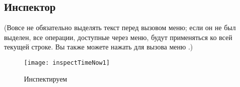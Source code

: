 \documentclass[a4paper,10pt,twoside]{book}
\begin{document}
\subsection{Инспектор}

(Вовсе не обязательно выделять текст перед вызовом меню; если он не был выделен, все операции, доступные через меню, будут применяться ко всей текущей строке.
Вы также можете нажать  для вызова меню .)

\begin{figure}[btp]
	\begin{center}
		\texttt{[image: inspectTimeNow1]}
	\end{center}
	\caption{Инспектируем \ct{TimeStamp now}}
\end{figure}
\end{document}
